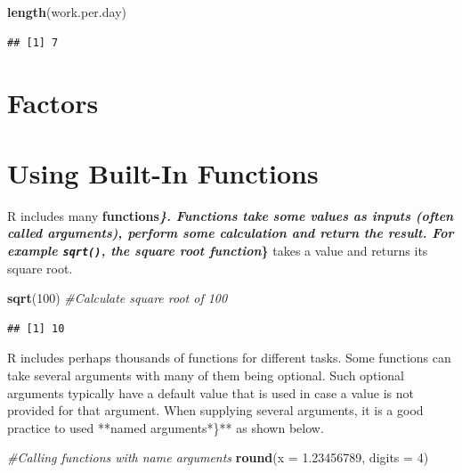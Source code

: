 \documentclass[]{krantz}
\makeatletter
\newenvironment{Shaded}{\begin{snugshade}}{\end{snugshade}}
\newcommand{\KeywordTok}[1]{\textcolor[rgb]{0.27,0.27,0.27}{\textbf{#1}}}
\newcommand{\DataTypeTok}[1]{\textcolor[rgb]{0.27,0.27,0.27}{#1}}
\newcommand{\DecValTok}[1]{\textcolor[rgb]{0.06,0.06,0.06}{#1}}
\newcommand{\FloatTok}[1]{\textcolor[rgb]{0.06,0.06,0.06}{#1}}
\newcommand{\CommentTok}[1]{\textcolor[rgb]{0.56,0.35,0.01}{\textit{#1}}}
\newcommand{\NormalTok}[1]{#1}
\newenvironment{kframe}{%
\medskip{}
\setlength{\fboxsep}{.8em}
 \def\at@end@of@kframe{}%
 \ifinner\ifhmode%
  \def\at@end@of@kframe{\end{minipage}}%
  \begin{minipage}{\columnwidth}%
 \fi\fi%
 \def\FrameCommand##1{\hskip\@totalleftmargin \hskip-\fboxsep
 \colorbox{shadecolor}{##1}\hskip-\fboxsep
     \hskip-\linewidth \hskip-\@totalleftmargin \hskip\columnwidth}%
 \MakeFramed {\advance\hsize-\width
   \@totalleftmargin\z@ \linewidth\hsize
   \@setminipage}}%
 {\par\unskip\endMakeFramed%
 \at@end@of@kframe}
\renewenvironment{Shaded}{\begin{kframe}}{\end{kframe}}
\theoremstyle{definition}
\theoremstyle{definition}
\theoremstyle{definition}
\theoremstyle{remark}
\makeatother
\begin{document}
\begin{Shaded}
\begin{Highlighting}[]
\KeywordTok{length}\NormalTok{(work.per.day)}
\end{Highlighting}
\end{Shaded}

\begin{verbatim}
## [1] 7
\end{verbatim}

\section{Factors}\label{factors}

\section{Using Built-In Functions}\label{using-built-in-functions}

R includes many \textbf{functions\emph{\}\textbf{. Functions take some
values as inputs (often called }arguments\textbf{), perform some
calculation and return the result. For example \texttt{sqrt()}, the
}square root function}\}} takes a value and returns its square root.

\begin{Shaded}
\begin{Highlighting}[]
\KeywordTok{sqrt}\NormalTok{(}\DecValTok{100}\NormalTok{) }\CommentTok{#Calculate square root of 100}
\end{Highlighting}
\end{Shaded}

\begin{verbatim}
## [1] 10
\end{verbatim}

R includes perhaps thousands of functions for different tasks. Some
functions can take several arguments with many of them being optional.
Such optional arguments typically have a default value that is used in
case a value is not provided for that argument. When supplying several
arguments, it is a good practice to used **named arguments*\}** as shown
below.

\begin{Shaded}
\begin{Highlighting}[]
\CommentTok{#Calling functions with name arguments}
\KeywordTok{round}\NormalTok{(}\DataTypeTok{x =} \FloatTok{1.23456789}\NormalTok{, }\DataTypeTok{digits =} \DecValTok{4}\NormalTok{) }
\end{Highlighting}
\end{Shaded}
\end{document}
